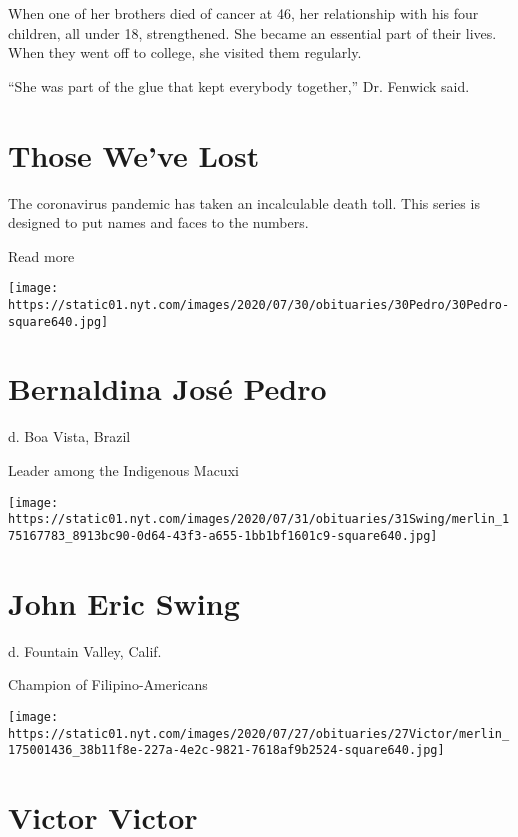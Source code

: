 When one of her brothers died of cancer at 46, her relationship with his
four children, all under 18, strengthened. She became an essential part
of their lives. When they went off to college, she visited them
regularly.

``She was part of the glue that kept everybody together,'' Dr. Fenwick
said.

\href{https://www.nytimes.com/interactive/2020/obituaries/people-died-coronavirus-obituaries.html?action=click\&pgtype=Article\&state=default\&region=BELOW_MAIN_CONTENT\&context=covid_obits_promo}{}

\hypertarget{those-weve-lost}{%
\section{Those We've Lost}\label{those-weve-lost}}

The coronavirus pandemic has taken an incalculable death toll. This
series is designed to put names and faces to the numbers.

Read more

\texttt{[image: https://static01.nyt.com/images/2020/07/30/obituaries/30Pedro/30Pedro-square640.jpg]}

\hypertarget{bernaldina-josuxe9-pedro}{%
\section{Bernaldina José Pedro}\label{bernaldina-josuxe9-pedro}}

d. Boa Vista, Brazil

Leader among the Indigenous Macuxi

\texttt{[image: https://static01.nyt.com/images/2020/07/31/obituaries/31Swing/merlin\_175167783\_8913bc90-0d64-43f3-a655-1bb1bf1601c9-square640.jpg]}

\hypertarget{john-eric-swing}{%
\section{John Eric Swing}\label{john-eric-swing}}

d. Fountain Valley, Calif.

Champion of Filipino-Americans

\texttt{[image: https://static01.nyt.com/images/2020/07/27/obituaries/27Victor/merlin\_175001436\_38b11f8e-227a-4e2c-9821-7618af9b2524-square640.jpg]}

\hypertarget{victor-victor}{%
\section{Victor Victor}\label{victor-victor}}

